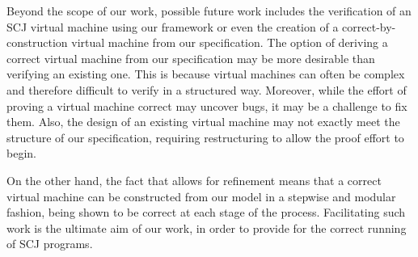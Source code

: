 Beyond the scope of our work, possible future work includes the
verification of an SCJ virtual machine using our framework or even the
creation of a correct-by-construction virtual machine from our
specification.
The option of deriving a correct virtual machine from our
specification may be more desirable than verifying an existing one.
This is because virtual machines can often be complex and therefore
difficult to verify in a structured way.
Moreover, while the effort of proving a virtual machine correct may
uncover bugs, it may be a challenge to fix them.
Also, the design of an existing virtual machine may not exactly meet
the structure of our specification, requiring restructuring to allow
the proof effort to begin.

On the other hand, the fact that \Circus{} allows for refinement means
that a correct virtual machine can be constructed from our model in a
stepwise and modular fashion, being shown to be correct at each stage
of the process.
Facilitating such work is the ultimate aim of our work, in order to
provide for the correct running of SCJ programs.


